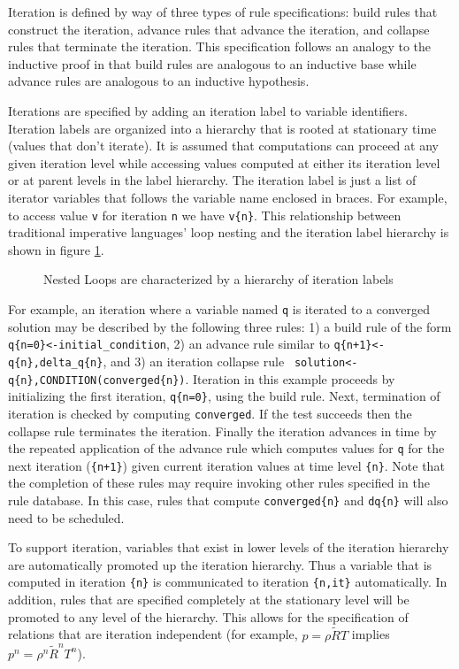 \documentclass[10pt,epsf]{book}
\begin{document}
Iteration is defined by way of three types of rule specifications:
build rules that construct the iteration, advance rules that advance
the iteration, and collapse rules that terminate the iteration.  This
specification follows an analogy to the inductive proof in that build
rules are analogous to an inductive base while advance rules are
analogous to an inductive hypothesis.


Iterations are specified by adding an iteration label to variable
identifiers.  Iteration labels are organized into a hierarchy that is
rooted at stationary time (values that don't iterate).  It is assumed
that computations can proceed at any given iteration level while
accessing values computed at either its iteration level or at parent
levels in the label hierarchy.  The iteration label is just a list of
iterator variables that follows the variable name enclosed in braces.
For example, to access value {\tt v} for iteration {\tt n} we have 
{\tt v\{n\}}.  This relationship between traditional imperative
languages' 
loop nesting and the iteration label hierarchy is shown in figure
\ref{fig:nested}. 

\begin{figure}[h]
\centerline{
\epsfxsize=3.4in
}
\caption{Nested Loops are characterized by a hierarchy of iteration labels}
\label{fig:nested}
\end{figure}

For example, an iteration where a variable named {\tt q} is iterated
to a converged solution may be described by the following three rules:
1) a build rule of the form {\tt q\{n=0\}<-initial\_condition}, 2) an
advance rule similar to {\tt q\{n+1\}<-q\{n\},delta\_q\{n\}}, and 3)
an iteration collapse rule {\tt
  solution<-q\{n\},CONDITION(converged\{n\})}.  Iteration in this
example proceeds by initializing the first iteration, {\tt q\{n=0\}},
using the build rule.  Next, termination of iteration is checked
by computing {\tt converged}.  If the test succeeds then the collapse
rule terminates the iteration.  Finally the iteration advances in time
by the repeated application of the advance rule which computes values
for {\tt q} for the next iteration ({\tt\{n+1\}}) given current
iteration values at time level {\tt\{n\}}.  Note that the completion
of these rules may require invoking other rules specified in the rule
database.  In this case, rules that compute {\tt converged\{n\}} and
{\tt dq\{n\}} will also need to be scheduled.

To support iteration, variables that exist in lower levels of the
iteration hierarchy are automatically promoted up the iteration
hierarchy.  Thus a variable that is computed in iteration {\tt\{n\}}
is communicated to iteration {\tt\{n,it\}} automatically.  In
addition, rules that are specified completely at the stationary level
will be promoted to any level of the hierarchy.  This allows for the
specification of relations that are iteration independent (for
example, $p = \rho \tilde{R} T$ implies $p^n = \rho^n \tilde{R}^n
T^n$).
\end{document}
